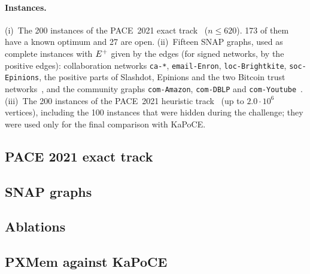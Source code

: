 \paragraph{Instances.}  (i)~The 200 instances of the PACE~2021 exact
track~\citep{KellerhalsKNZ21pace} ($n\le 620$).  173 of them have a known
optimum and 27 are open.  (ii)~Fifteen SNAP graphs, used as complete
instances with $E^{+}$ given by the edges (for signed networks, by the positive
edges): collaboration networks \texttt{ca-*}, \texttt{email-Enron},
\texttt{loc-Brightkite}, \texttt{soc-Epinions}, the positive parts of
Slashdot, Epinions and the two Bitcoin trust networks~\citep{leskovec2010signedchi,kumar2016bitcoin},
and the community graphs \texttt{com-Amazon}, \texttt{com-DBLP} and
\texttt{com-Youtube}~\citep{yang2012groundtruth}.  (iii)~The 200 instances of the PACE~2021 heuristic
track~\citep{KellerhalsKNZ21pace} (up to $2.0\cdot10^6$ vertices), including the
100 instances that were hidden during the challenge; they were used only for
the final comparison with KaPoCE.

\FloatBarrier
\subsection{PACE 2021 exact track}



\FloatBarrier
\subsection{SNAP graphs}\label{sec:snap}



\FloatBarrier
\subsection{Ablations}



\FloatBarrier
\subsection{PXMem against KaPoCE}\label{sec:h2h}


